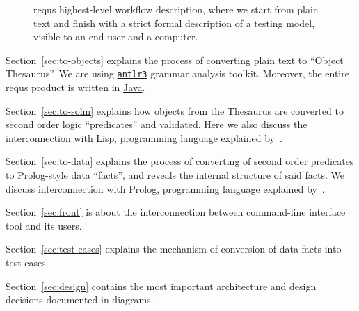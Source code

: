 \documentclass[12pt,oneside,letterpaper]{article}
\begin{document}
\begin{figure}[ht]
\centering
{}
\caption{requs highest-level workflow description, where we start
from plain text and finish with a strict formal description
of a testing model, visible to an end-user and a computer.}
\label{fig:Workflow}
\end{figure}

Section~\ref{sec:to-objects} explains the process of converting plain text
to ``Object Thesaurus''. We are using
\href{http://www.altlr.org}{\texttt{antlr3}} grammar analysis toolkit.
Moreover, the entire requs product is written in \href{http://www.java.com/en/}{Java}.

Section~\ref{sec:to-solm} explains how objects from the Thesaurus are converted to
second order logic ``predicates''
and validated. Here we also discuss the interconnection with
Lisp, programming language explained by~\cite{graham93}.

Section~\ref{sec:to-data} explains the process of converting of
second order predicates to Prolog-style data ``facts'', and reveals the internal
structure of said facts. We discuss interconnection with Prolog,
programming language explained by~\cite{shapiro94}.

Section~\ref{sec:front} is about the interconnection between 
command-line interface tool and its users.

Section~\ref{sec:test-cases} explains the mechanism of conversion
of data facts into test cases.

Section~\ref{sec:design} contains the most important architecture
and design decisions documented in diagrams.
\end{document}
